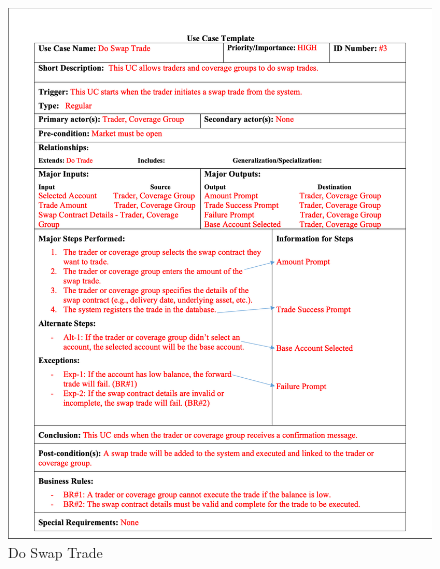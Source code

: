 \documentclass[a4paper]{report}
\begin{document}
\begin{figure}[h!]
    \centering
    \includegraphics[width=\textwidth]{images/uc/3-do-swap-trade.png}
    \caption{Do Swap Trade}
    \label{fig:3-do-swap-trade}
\end{figure}
\end{document}
